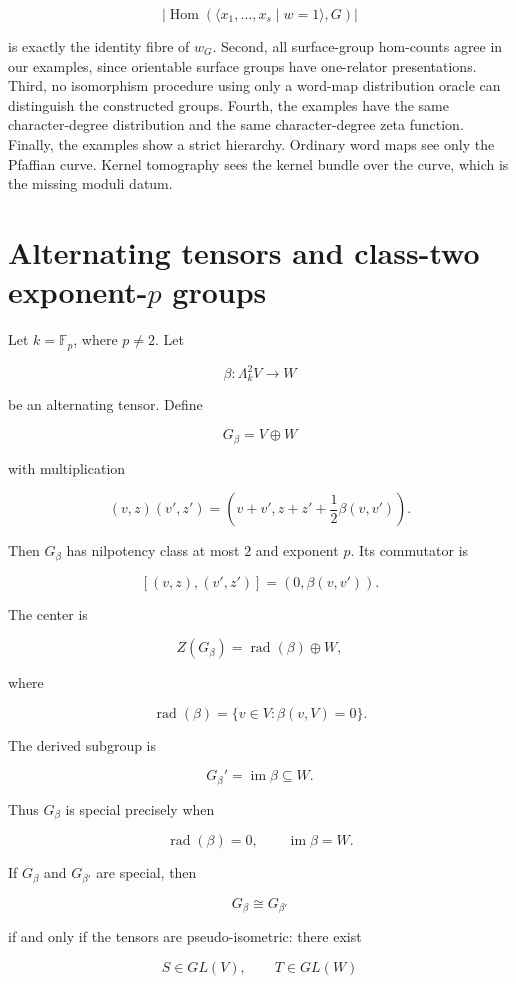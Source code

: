 \documentclass[11pt]{article}
\begin{document}
\[
|\operatorname{Hom}(\langle x_1,\ldots,x_s\mid w=1\rangle,G)|
\]

is exactly the identity fibre of $w_G$. Second, all surface-group hom-counts agree in our examples, since orientable surface groups have one-relator presentations. Third, no isomorphism procedure using only a word-map distribution oracle can distinguish the constructed groups. Fourth, the examples have the same character-degree distribution and the same character-degree zeta function. Finally, the examples show a strict hierarchy. Ordinary word maps see only the Pfaffian curve. Kernel tomography sees the kernel bundle over the curve, which is the missing moduli datum.

\section{Alternating tensors and class-two exponent-$p$ groups}

Let $k=\mathbb F_p$, where $p\neq2$. Let

\[
\beta:\Lambda^2_k V\to W
\]

be an alternating tensor. Define

\[
G_\beta=V
\oplus W
\]

with multiplication

\[
(v,z)(v',z')
=\left(
v+v',
z+z'+\frac12\beta(v,v')
\right).
\]

Then $G_\beta$ has nilpotency class at most $2$ and exponent $p$. Its commutator is

\[
[(v,z),(v',z')]
=(0,\beta(v,v')).
\]

The center is

\[
Z(G_\beta)
=\operatorname{rad}(\beta)\oplus W,
\]

where

\[
\operatorname{rad}(\beta)
=\{v\in V:\beta(v,V)=0\}.
\]

The derived subgroup is

\[
G_\beta'=\operatorname{im}\beta\subseteq W.
\]

Thus $G_\beta$ is special precisely when

\[
\operatorname{rad}(\beta)=0,
\qquad
\operatorname{im}\beta=W.
\]

If $G_\beta$ and $G_{\beta'}$ are special, then

\[
G_\beta\cong G_{\beta'}
\]

if and only if the tensors are pseudo-isometric: there exist

\[
S\in GL(V),\qquad T\in GL(W)
\]
\end{document}
